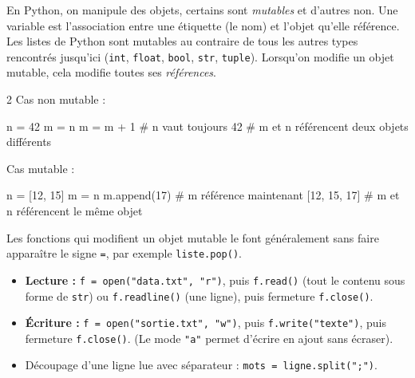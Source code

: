 \documentclass[11pt,a4paper]{article}
\begin{document}
	
	\begin{tcolorbox}[left=0cm,title=\bf{\faPython \; Mutables et non mutables},colbacktitle=cfond]
		En Python, on manipule des objets, certains sont \textit{mutables} et d'autres non. Une variable est l'association entre une étiquette (le nom) et l'objet qu'elle référence. Les listes de Python sont mutables au contraire de tous les autres types rencontrés jusqu'ici ({\tt int}, {\tt float}, {\tt bool}, {\tt str}, {\tt tuple}). Lorsqu'on modifie un objet mutable, cela modifie toutes ses \textit{références}.
			
		\setlength{\multicolsep}{0pt}
		\begin{multicols}{2}
			Cas non mutable :
			\begin{python}
	n = 42
	m = n
	m = m + 1
	# n vaut toujours 42
	# m et n référencent deux objets différents
	\end{python}
			Cas mutable : 
			\begin{python} 
	n = [12, 15]
	m = n
	m.append(17)
	# m référence maintenant [12, 15, 17]
	# m et n référencent le même objet
			\end{python}
		\end{multicols}
		Les fonctions qui modifient un objet mutable le font généralement sans faire apparaître le signe {\tt =}, par exemple \texttt{liste.pop()}.
	\end{tcolorbox}

	\begin{tcolorbox}[left=0cm,title=\bf{\faPython \; Fichiers textes},colbacktitle=cfond]
		\begin{itemize}
			\item[\textbullet] \textbf{Lecture :} \texttt{f = open("data.txt", "r")}, puis \texttt{f.read()} (tout le contenu sous forme de \texttt{str}) ou \texttt{f.readline()} (une ligne), puis fermeture \texttt{f.close()}.
			\item[\textbullet] \textbf{Écriture :} \texttt{f = open("sortie.txt", "w")}, puis \texttt{f.write("texte\n")}, puis fermeture \texttt{f.close()}. (Le mode \texttt{"a"} permet d'écrire en ajout sans écraser).
			\item[\textbullet] Découpage d'une ligne lue avec séparateur : \texttt{mots = ligne.split(";")}.
		\end{itemize}
	\end{tcolorbox}
\end{document}

